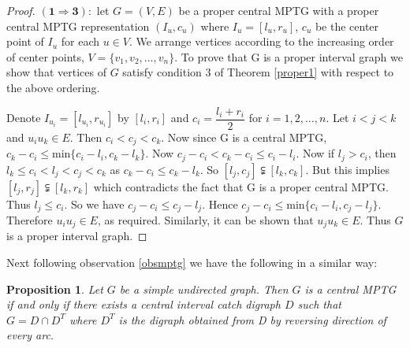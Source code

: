 \documentclass{article}
\newtheorem{prop}[thm]{Proposition}
\theoremstyle{definition}
\numberwithin{equation}{section}
\begin{document}
\begin{proof}
\noindent 
$\mathbf{(1\Rightarrow 3):}$ let $G=(V,E)$ be a proper central MPTG with a proper central MPTG representation $(I_{u},c_{u})$ where $I_{u}=[l_{u},r_{u}]$, $c_{u}$ be the center point of $I_{u}$ for each $u\in V$. We arrange vertices according to the increasing order of center points, $V=\{v_{1},v_{2},\hdots,v_{n}\}$. To prove that G is a proper interval graph we show that vertices of $G$ satisfy condition $3$ of Theorem \ref{proper1} with respect to the above ordering. 

\noindent Denote $I_{u_{i}}=[l_{u_{i}},r_{u_{i}}]$ by $[l_{i},r_{i}]$ and $c_{i}=\dfrac{l_{i}+r_{i}}{2}$ for $i=1,2,\hdots,n$. Let $i<j<k$ and $u_{i}u_{k}\in E$. Then $c_{i}<c_{j}<c_{k}$. Now since G is a central MPTG, $c_{k}-c_{i}\leq \text{min}\{c_{i}-l_{i},c_{k}-l_{k}\}$. Now $c_{j}-c_{i}<c_{k}-c_{i}\leq c_{i}-l_{i}$. Now if $l_{j}>c_{i}$, then $l_{k}\leq c_{i}<l_{j}<c_{j}<c_{k}$ as $c_{k}-c_{i}\leq c_{k}-l_{k}$. So $[l_{j},c_{j}] \subsetneqq [l_{k},c_{k}]$. But this implies $[l_{j},r_{j}]\subsetneqq [l_{k},r_{k}]$ which contradicts the fact that G is a proper central MPTG. Thus $l_{j}\leq c_{i}$. So we have $c_{j}-c_{i}\leq c_{j}-l_{j}$. Hence $c_{j}-c_{i}\leq \text{min} \{c_{i}-l_{i},c_{j}-l_{j}\}$. Therefore $u_{i}u_{j}\in E$, as required. Similarly, it can be shown that $u_{j}u_{k} \in E$. Thus $G$ is a proper interval graph.
\end{proof}

\noindent Next following observation \ref{obsmptg} we have the following in a similar way:

\begin{prop}
Let $G$ be a simple undirected graph. Then $G$ is a central MPTG if and only if there exists a
central interval catch digraph $D$ such that $G = D\cap D^T$ where $D^T$ is the digraph obtained from D by reversing
direction of every arc.
\end{prop}
\end{document}
